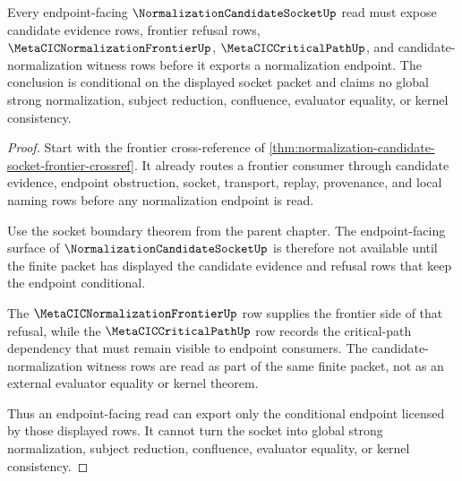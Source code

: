 \begin{theorem}
\label{thm:normalization-candidate-socket-frontier-dependency}
Every endpoint-facing $\NormalizationCandidateSocketUp$ read must expose candidate evidence rows, frontier refusal rows, $\MetaCICNormalizationFrontierUp$, $\MetaCICCriticalPathUp$, and candidate-normalization witness rows before it exports a normalization endpoint. The conclusion is conditional on the displayed socket packet and claims no global strong normalization, subject reduction, confluence, evaluator equality, or kernel consistency.
\end{theorem}
\begin{proof}
Start with the frontier cross-reference of \autoref{thm:normalization-candidate-socket-frontier-crossref}. It already routes a frontier consumer through candidate evidence, endpoint obstruction, socket, transport, replay, provenance, and local naming rows before any normalization endpoint is read.

Use the socket boundary theorem from the parent chapter. The endpoint-facing surface of $\NormalizationCandidateSocketUp$ is therefore not available until the finite packet has displayed the candidate evidence and refusal rows that keep the endpoint conditional.

The $\MetaCICNormalizationFrontierUp$ row supplies the frontier side of that refusal, while the $\MetaCICCriticalPathUp$ row records the critical-path dependency that must remain visible to endpoint consumers. The candidate-normalization witness rows are read as part of the same finite packet, not as an external evaluator equality or kernel theorem.

Thus an endpoint-facing read can export only the conditional endpoint licensed by those displayed rows. It cannot turn the socket into global strong normalization, subject reduction, confluence, evaluator equality, or kernel consistency.
\end{proof}
